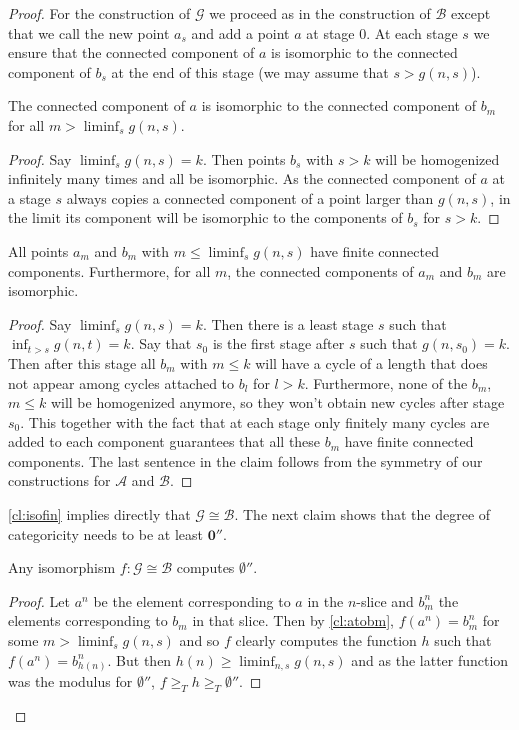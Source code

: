 \documentclass[10pt,a4paper]{amsart}
\newcommand{\G}{\mathcal{G}}
\newcommand\+[1]{\mathcal{#1}}
\renewcommand\*[1]{\mathbf{#1}}
\renewcommand\=[1]{\text{#1}}
\renewcommand\*[1]{\mathbf{#1}}
\newcommand{\A}{\mathcal{A}}
\newcommand{\B}{\mathcal{B}}
\begin{document}
\begin{proof}
   For the construction of $\G$ we proceed as in the construction of $\B$ except that we call the new point $a_s$ and add a point $a$ at stage $0$. At each stage $s$ we ensure that the connected component of $a$ is isomorphic to the connected component of $b_s$ at the end of this stage (we may assume that $s>g(n,s)$).
   \begin{claim}\label{cl:atobm}
     The connected component of $a$ is isomorphic to the connected component of $b_m$ for all $m>\liminf_s g(n,s)$.
   \end{claim}
   \begin{proof}
     Say $\liminf_s g(n,s)=k$. Then points $b_s$ with $s>k$ will be homogenized infinitely many times and all be isomorphic. As the connected component of $a$ at a stage $s$ always copies a connected component of a point larger than $g(n,s)$, in the limit its component will be isomorphic to the components of $b_s$ for $s>k$.
   \end{proof}
   \begin{claim}\label{cl:isofin}
     All points $a_m$ and $b_m$ with $m\leq \liminf_s g(n,s)$ have finite connected components. 
     Furthermore, for all $m$, the connected components of $a_m$ and $b_m$ are isomorphic.
   \end{claim}
   \begin{proof}
     Say $\liminf_s g(n,s)=k$. Then there is a least stage $s$ such that $\inf_{t>s} g(n,t)= k$. Say that $s_0$ is the first stage after $s$ such that $g(n,s_0)=k$. Then after this stage all $b_m$ with $m\leq k$ will have a cycle of a length that does not appear among cycles attached to $b_l$ for $l>k$. Furthermore, none of the $b_m$, $m\leq k$ will be homogenized anymore, so they won't obtain new cycles after stage $s_0$. This together with the fact that at each stage only finitely many cycles are added to each component guarantees that all these $b_m$ have finite connected components.
     The last sentence in the claim follows from the symmetry of our constructions for $\A$ and $\B$.  
   \end{proof}
   \cref{cl:isofin} implies directly that $\G\cong \B$. The next claim shows that the degree of categoricity needs to be at least $\mathbf 0''$. 
   \begin{claim}
   Any isomorphism $f:\G\cong \B$ computes $\emptyset''$.
 \end{claim}
 \begin{proof}
 Let $a^n$ be the element corresponding to $a$ in the $n$-slice and $b^n_m$ the elements corresponding to $b_m$ in that slice. Then by \cref{cl:atobm}, $f(a^n)=b_m^n$ for some $m>\liminf_s g(n,s)$ and so $f$ clearly computes the function $h$ such that $f(a^n)=b_{h(n)}^n$. But then $h(n)\geq \liminf_{n,s} g(n,s)$ and as the latter function was the modulus for $\emptyset''$, $f\geq_T h\geq_T \emptyset''$.

\end{proof}
\end{proof}
\end{document}
